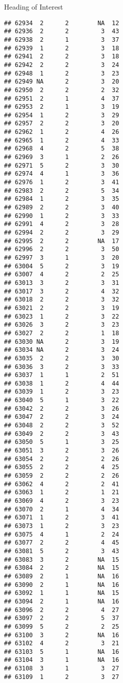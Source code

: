 \documentclass[
  ignorenonframetext,
]{beamer}
\begin{document}
\begin{frame}[fragile]{Heading of Interest}
\begin{verbatim}
## 62934  2      2        NA  12
## 62936  2      2         3  43
## 62938  2      1         3  37
## 62939  1      2         3  18
## 62941  2      2         3  18
## 62942  2      2         3  24
## 62948  1      2         3  23
## 62949 NA      2         3  20
## 62950  2      2         2  32
## 62951  2      1         4  37
## 62953  2      1         3  19
## 62954  1      2         3  29
## 62957  2      2         3  20
## 62962  1      2         4  26
## 62965  1      2         4  33
## 62968  4      2         5  38
## 62969  3      1         2  26
## 62971  5      2         3  30
## 62974  4      1         3  36
## 62976  1      2         3  41
## 62983  2      2         5  34
## 62984  1      2         3  35
## 62989  2      2         3  40
## 62990  1      2         3  33
## 62991  4      2         3  28
## 62994  2      2         3  29
## 62995  2      2        NA  17
## 62996  2      2         3  50
## 62997  3      1         3  20
## 63004  5      2         3  19
## 63007  4      2         2  25
## 63013  3      2         3  31
## 63017  3      2         4  32
## 63018  2      2         3  32
## 63021  2      2         3  19
## 63023  1      2         3  22
## 63026  3      2         3  23
## 63027  2      2         1  18
## 63030 NA      2         3  19
## 63034 NA      2         3  24
## 63035  2      2         3  30
## 63036  3      2         3  33
## 63037  1      1         2  51
## 63038  1      2         4  44
## 63039  1      2         3  23
## 63040  5      1         3  22
## 63042  2      2         3  26
## 63047  2      2         3  24
## 63048  2      2         3  52
## 63049  2      2         3  43
## 63050  5      1         3  25
## 63051  3      2         3  26
## 63054  2      2         2  26
## 63055  2      2         4  25
## 63059  2      2         2  26
## 63062  4      2         2  41
## 63063  1      2         1  21
## 63069  4      2         3  23
## 63070  2      1         4  34
## 63071  1      2         3  41
## 63073  1      2         3  23
## 63075  4      1         2  24
## 63077  2      2         4  45
## 63081  5      2         3  43
## 63083  3      2        NA  15
## 63084  2      2        NA  15
## 63089  2      1        NA  16
## 63090  2      1        NA  16
## 63092  1      1        NA  15
## 63094  2      1        NA  16
## 63096  2      2         4  27
## 63097  2      2         5  37
## 63099  5      2         2  25
## 63100  3      2        NA  16
## 63102  4      2         3  21
## 63103  5      1        NA  16
## 63104  3      1        NA  16
## 63108  3      1         3  27
## 63109  1      2         3  27

\end{verbatim}
\end{frame}
\end{document}
